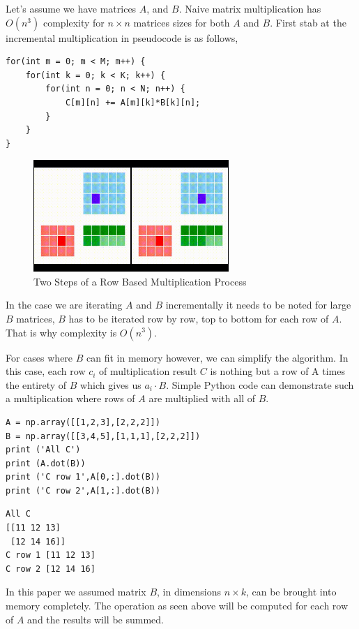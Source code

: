 \documentclass{article}
\begin{document}
Let's assume we have matrices $A$, and $B$. Naive matrix multiplication has
$O(n^3)$ complexity for $n \times n$ matrices sizes for both $A$ and $B$. First
stab at the incremental multiplication in pseudocode is as follows,

\begin{verbatim}
for(int m = 0; m < M; m++) {
    for(int k = 0; k < K; k++) {
        for(int n = 0; n < N; n++) {
            C[m][n] += A[m][k]*B[k][n];
        }
    }
}
\end{verbatim}

\begin{figure}[h]
  \centering
  \includegraphics[width=20em]{mult1.jpg}
  \caption{Two Steps of a Row Based Multiplication Process}
  \label{fig:mult1}
\end{figure}

In the case we are iterating $A$ and $B$ incrementally it needs to be noted for
large $B$ matrices, $B$ has to be iterated row by row, top to bottom for each
row of $A$. That is why complexity is $O(n^3)$.

For cases where $B$ can fit in memory however, we can simplify the algorithm.
In this case, each row $c_i$ of multiplication result $C$ is nothing but a row
of A times the entirety of $B$ which gives us $a_i \cdot B$. Simple Python code
can demonstrate such a multiplication where rows of $A$ are multiplied with all
of $B$.

\begin{verbatim}
A = np.array([[1,2,3],[2,2,2]])
B = np.array([[3,4,5],[1,1,1],[2,2,2]])
print ('All C')
print (A.dot(B))
print ('C row 1',A[0,:].dot(B))
print ('C row 2',A[1,:].dot(B))
\end{verbatim}

\begin{verbatim}
All C
[[11 12 13]
 [12 14 16]]
C row 1 [11 12 13]
C row 2 [12 14 16]
\end{verbatim}

In this paper we assumed matrix $B$, in dimensions $n \times k$, can be brought
into memory completely. The operation as seen above will be computed for each
row of $A$ and the results will be summed.
\end{document}
